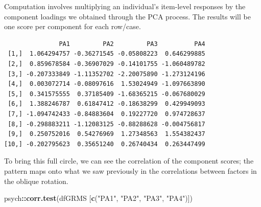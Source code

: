\documentclass[
  english,
]{book}
\newenvironment{Shaded}{\begin{snugshade}}{\end{snugshade}}
\newcommand{\CommentTok}[1]{\textcolor[rgb]{0.56,0.35,0.01}{\textit{#1}}}
\newcommand{\DataTypeTok}[1]{\textcolor[rgb]{0.13,0.29,0.53}{#1}}
\newcommand{\DecValTok}[1]{\textcolor[rgb]{0.00,0.00,0.81}{#1}}
\newcommand{\KeywordTok}[1]{\textcolor[rgb]{0.13,0.29,0.53}{\textbf{#1}}}
\newcommand{\NormalTok}[1]{#1}
\newcommand{\OperatorTok}[1]{\textcolor[rgb]{0.81,0.36,0.00}{\textbf{#1}}}
\newcommand{\OtherTok}[1]{\textcolor[rgb]{0.56,0.35,0.01}{#1}}
\newcommand{\StringTok}[1]{\textcolor[rgb]{0.31,0.60,0.02}{#1}}
\begin{document}
Computation involves multiplying an individual's item-level responses by the component loadings we obtained through the PCA process. The results will be one score per component for each row/case.

\begin{Shaded}
\end{Shaded}

\begin{verbatim}
               PA1         PA2         PA3          PA4
 [1,]  1.064294757 -0.36271545 -0.05808223  0.646299885
 [2,]  0.859678584 -0.36907029 -0.14101755 -1.060489782
 [3,] -0.207333849 -1.11352702 -2.20075890 -1.273124196
 [4,]  0.003072714 -0.08097616  1.53024949 -1.097663890
 [5,]  0.341575555  0.37185409 -1.68365215 -0.067680029
 [6,]  1.388246787  0.61847412 -0.18638299  0.429949093
 [7,] -1.094742433 -0.84883604  0.19227720  0.974728637
 [8,] -0.298883211 -1.12083125 -0.88288628 -0.004756817
 [9,]  0.250752016  0.54276969  1.27348563  1.554382437
[10,] -0.202795623  0.35651240  0.26740434  0.263447499
\end{verbatim}

\begin{Shaded}
\end{Shaded}

To bring this full circle, we can see the correlation of the component scores; the pattern maps onto what we saw previously in the correlations between factors in the oblique rotation.

\begin{Shaded}
\begin{Highlighting}[]
\NormalTok{psych}\OperatorTok{::}\KeywordTok{corr.test}\NormalTok{(dfGRMS [}\KeywordTok{c}\NormalTok{(}\StringTok{"PA1"}\NormalTok{, }\StringTok{"PA2"}\NormalTok{, }\StringTok{"PA3"}\NormalTok{, }\StringTok{"PA4"}\NormalTok{)])}
\end{Highlighting}
\end{Shaded}
\end{document}

